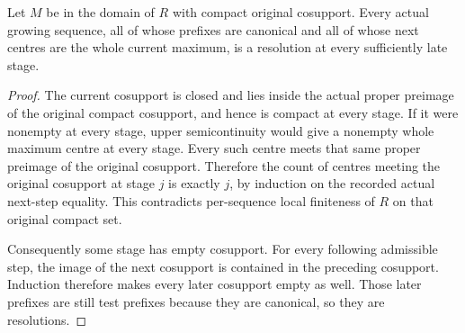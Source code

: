 \begin{lemma}
\label{hir:compact-cosupport-maximum-sequence-terminates}
\leanok
Let $M$ be in the domain of $R$ with compact original cosupport.
Every actual growing sequence, all of whose prefixes are canonical
and all of whose next centres are the whole current maximum,
is a resolution at every sufficiently late stage.
\end{lemma}
\begin{proof}
The current cosupport is closed and lies inside the actual
proper preimage of the original compact cosupport, and hence
is compact at every stage. If it were nonempty at every stage,
upper semicontinuity would give a nonempty whole maximum centre
at every stage. Every such centre meets that same proper
preimage of the original cosupport. Therefore the count of
centres meeting the original cosupport at stage $j$ is exactly
$j$, by induction on the recorded actual next-step equality.
This contradicts per-sequence local finiteness of $R$ on that
original compact set.

Consequently some stage has empty cosupport. For every following
admissible step, the image of the next cosupport is contained
in the preceding cosupport. Induction therefore makes every
later cosupport empty as well. Those later prefixes are still
test prefixes because they are canonical, so they are resolutions.
\end{proof}

